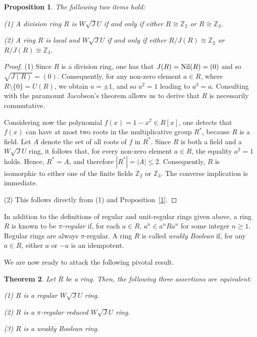 \documentclass[12pt]{amsart}
\newtheorem{theorem}{Theorem}[section] \newtheorem{mtheorem}[theorem]{Main Theorem}
\newtheorem{proposition}[theorem]{Proposition} \newtheorem{lemma}[theorem]{Lemma}
\begin{document}
\begin{proposition}\label{3.26} The following two items hold:

(1) A division ring \(R\) is $W\sqrt{J}U$ if and only if either \(R \cong \mathbb{Z}_2\) or \(R \cong \mathbb{Z}_3\).

(2) A ring \( R \) is local and $W\sqrt{J}U$ if and only if either \( R/J(R) \cong \mathbb{Z}_2 \) or
\(R/J(R) \cong  \mathbb{Z}_3 \).
\end{proposition}

\begin{proof} (1) Since \(R\) is a division ring, one has that $J(R)={\rm Nil}(R)=(0)$ and so $\sqrt{J(R)}=(0)$. Consequently, for any non-zero element $a \in R$, where $R \setminus \{0\} = U(R)$, we obtain $a=\pm 1$, and so $a^2 = 1$ leading to $a^3 = a$. Consulting with the paramount Jacobson's theorem allows us to derive that $R$ is necessarily commutative.

Considering now the polynomial \( f(x) = 1 - x^2 \in R[x] \), one detects that \(f(x)\) can have at most two roots in the multiplicative group \(R^{\ast}\), because \(R\) is a field. Let \(A\) denote the set of all roots of \(f\) in \(R^{\ast}\). Since \(R\) is both a field and a $W\sqrt{J}U$ ring, it follows that, for every non-zero element \(a \in R\), the equality \(a^2 = 1\) holds. Hence, \(R^{\ast} = A\), and therefore \(|R^{\ast}| = |A| \le 2\). Consequently, \(R\) is isomorphic to either one of the finite fields \(\mathbb{Z}_2\) or \(\mathbb{Z}_3\). The converse implication is immediate.

(2) This follows directly from (1) and Proposition~\ref{1}.
\end{proof}

In addition to the definitions of regular and unit-regular rings given above, a ring $R$ is known to be {\it $\pi$-regular} if, for each $a\in R$, $a^n\in a^nRa^n$ for some integer $n\ge 1$. Regular rings are always $\pi$-regular. A ring $R$ is called {\it weakly Boolean} if, for any $a \in R$, either $a$ or $-a$ is an idempotent.

We are now ready to attack the following pivotal result.

\begin{theorem}\label{3.13} Let \(R\) be a ring. Then, the following three assertions are equivalent:

(1) \(R\) is a regular $W\sqrt{J}U$ ring.

(2) \(R\) is a \(\pi\)-regular reduced $W\sqrt{J}U$ ring.

(3) \(R\) is a weakly Boolean ring.
\end{theorem}
\end{document}
